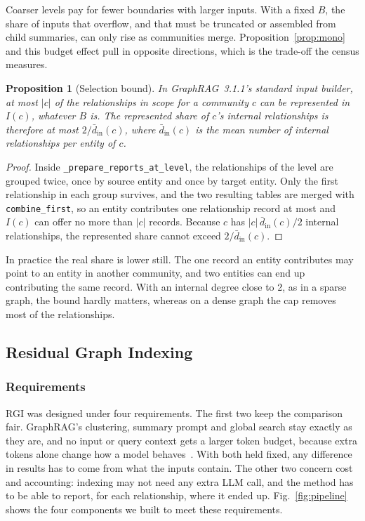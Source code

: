 \documentclass{ieeeaccess}
\newtheorem{proposition}{Proposition}
\theoremstyle{remark}
\newcommand{\In}{I}
\begin{document}
Coarser levels pay for fewer boundaries with larger inputs. With a fixed $B$, the share of inputs that overflow, and that must be truncated or assembled from child summaries, can only rise as communities merge. Proposition~\ref{prop:mono} and this budget effect pull in opposite directions, which is the trade-off the census measures.

\begin{proposition}[Selection bound]\label{prop:select}
In GraphRAG~3.1.1's standard input builder, at most $|c|$ of the relationships in scope for a community $c$ can be represented in $\In(c)$, whatever $B$ is. The represented share of $c$'s internal relationships is therefore at most $2/\bar d_{\mathrm{in}}(c)$, where $\bar d_{\mathrm{in}}(c)$ is the mean number of internal relationships per entity of $c$.
\end{proposition}
\begin{proof}
Inside \texttt{\_prepare\_reports\_at\_level}, the relationships of the level are grouped twice, once by source entity and once by target entity. Only the first relationship in each group survives, and the two resulting tables are merged with \texttt{combine\_first}, so an entity contributes one relationship record at most and $\In(c)$ can offer no more than $|c|$ records. Because $c$ has $|c|\,\bar d_{\mathrm{in}}(c)/2$ internal relationships, the represented share cannot exceed $2/\bar d_{\mathrm{in}}(c)$.
\end{proof}

In practice the real share is lower still. The one record an entity contributes may point to an entity in another community, and two entities can end up contributing the same record. With an internal degree close to 2, as in a sparse graph, the bound hardly matters, whereas on a dense graph the cap removes most of the relationships.

\subsection{Residual Graph Indexing}\label{sec:rgi}

\subsubsection{Requirements}
RGI was designed under four requirements. The first two keep the comparison fair. GraphRAG's clustering, summary prompt and global search stay exactly as they are, and no input or query context gets a larger token budget, because extra tokens alone change how a model behaves~\cite{liu2024lost}. With both held fixed, any difference in results has to come from what the inputs contain. The other two concern cost and accounting: indexing may not need any extra LLM call, and the method has to be able to report, for each relationship, where it ended up. Fig.~\ref{fig:pipeline} shows the four components we built to meet these requirements.
\end{document}
